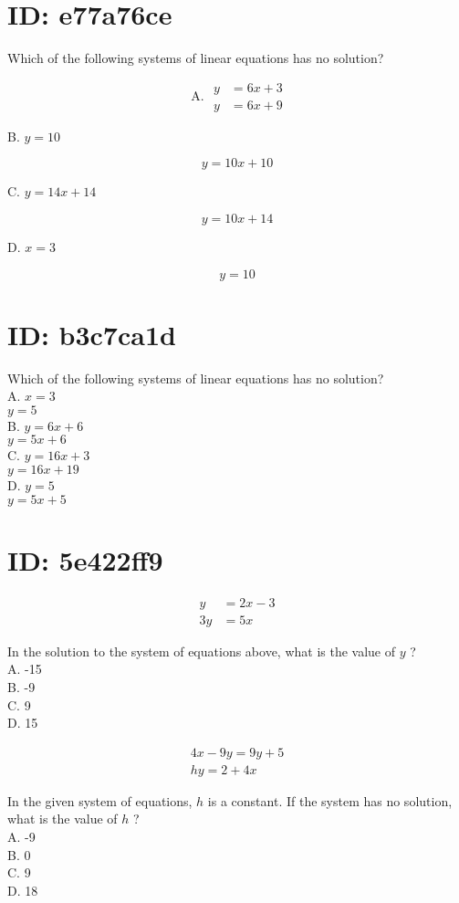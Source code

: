 \section*{ID: e77a76ce}
Which of the following systems of linear equations has no solution?

$$
\text { A. } \begin{aligned}
y & =6 x+3 \\
y & =6 x+9
\end{aligned}
$$

B. $y=10$

$$
y=10 x+10
$$

C. $y=14 x+14$

$$
y=10 x+14
$$

D. $x=3$

$$
y=10
$$

\section*{ID: b3c7ca1d}
Which of the following systems of linear equations has no solution?\\
A. $x=3$\\
$y=5$\\
B. $y=6 x+6$\\
$y=5 x+6$\\
C. $y=16 x+3$\\
$y=16 x+19$\\
D. $y=5$\\
$y=5 x+5$

\section*{ID: 5e422ff9}
$$
\begin{aligned}
y & =2 x-3 \\
3 y & =5 x
\end{aligned}
$$

In the solution to the system of equations above, what is the value of $y$ ?\\
A. -15\\
B. -9\\
C. 9\\
D. 15

$$
\begin{gathered}
4 x-9 y=9 y+5 \\
h y=2+4 x
\end{gathered}
$$

In the given system of equations, $h$ is a constant. If the system has no solution, what is the value of $h$ ?\\
A. -9\\
B. 0\\
C. 9\\
D. 18

